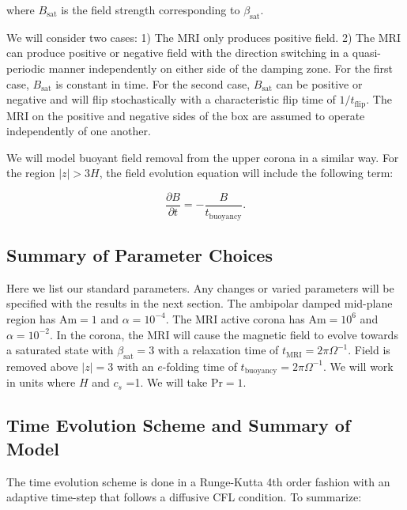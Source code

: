 \noindent where $B_{\text{sat}}$ is the field strength corresponding to $\beta_{\text{sat}}$.  

We will consider two cases: 1) The MRI only produces positive field.  2) The MRI can produce positive or negative field with the direction switching in a quasi-periodic manner independently on either side of the damping zone.  For the first case, $B_{\text{sat}}$ is constant in time.  For the second case, $B_{\text{sat}}$ can be positive or negative and will flip stochastically with a characteristic flip time of $1/t_{\text{flip}}$.  The MRI on the positive and negative sides of the box are assumed to operate independently of one another.  

We will model buoyant field removal from the upper corona in a similar way.  For the region $|z|>3H$, the field evolution equation will include the following term:

\begin{equation}
\frac{\partial B}{\partial t} = -\frac{B}{t_\text{buoyancy}}.
\end{equation}


\subsection{Summary of Parameter Choices}
Here we list our standard parameters.  Any changes or varied parameters will be specified with the results in the next section.  The ambipolar damped mid-plane region has $\text{Am}=1$ and $\alpha=10^{-4}$.  The MRI active corona has $\text{Am}=10^6$ and $\alpha=10^{-2}$.  In the corona, the MRI will cause the magnetic field to evolve towards a saturated state with $\beta_{\text{sat}}=3$ with a relaxation time of $t_\text{MRI}=2\pi \Omega^{-1}$.  Field is removed above $|z|=3$ with an $e$-folding time of $t_\text{buoyancy}=2\pi \Omega^{-1}$.  We will work in units where $H$ and $c_s$ =1.  We will take $\text{Pr}=1$.  


\subsection{Time Evolution Scheme and Summary of Model}
The time evolution scheme is done in a Runge-Kutta 4th order fashion with an adaptive time-step that follows a diffusive CFL condition.  To summarize:

